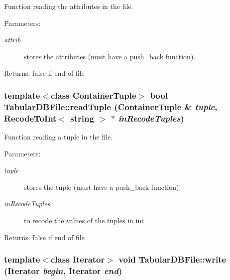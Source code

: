 Function reading the attributes in the file. 

\begin{Desc}
\item[Parameters:]
\begin{description}
\item[{\em attrib}]stores the attributes (must have a push\_\-back function). \end{description}
\end{Desc}
\begin{Desc}
\item[Returns:]false if end of file \end{Desc}
\subsubsection{\setlength{\rightskip}{0pt plus 5cm}template$<$class Container\-Tuple$>$ bool Tabular\-DBFile::read\-Tuple (Container\-Tuple \& {\em tuple}, {\bf Recode\-To\-Int}$<$ string $>$ $\ast$ {\em in\-Recode\-Tuples})\hspace{0.3cm}{\tt  [protected]}}\label{class_tabular_d_b_file_d5a96f52ba726269c868339f1fc585fd}


Function reading a tuple in the file. 

\begin{Desc}
\item[Parameters:]
\begin{description}
\item[{\em tuple}]stores the tuple (must have a push\_\-back function). \item[{\em in\-Recode\-Tuples}]to recode the values of the tuples in int \end{description}
\end{Desc}
\begin{Desc}
\item[Returns:]false if end of file \end{Desc}
\subsubsection{\setlength{\rightskip}{0pt plus 5cm}template$<$class Iterator$>$ void Tabular\-DBFile::write (Iterator {\em begin}, Iterator {\em end})\hspace{0.3cm}{\tt  [protected]}}\label{class_tabular_d_b_file_bbf288b62789372257be6f7617fd6ec7}


